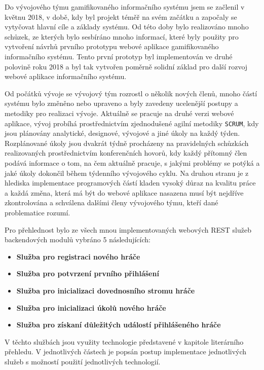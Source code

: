 \documentclass[twoside, 12pt]{article}
\begin{document}
{Do vývojového týmu gamifikovaného informačního systému jsem se začlenil v květnu 2018,
v době, kdy byl projekt téměř na svém začátku a započaly se vytyčovat hlavní cíle a základy systému.
Od této doby bylo realizováno mnoho schůzek, ze kterých bylo sesbíráno mnoho informací,
které byly použity pro vytvoření návrhů prvního prototypu webové aplikace gamifikovaného informačního systému.
Tento první prototyp byl implementován ve druhé polovině roku 2018 a byl tak vytvořen poměrně solidní základ
pro další rozvoj webové aplikace informačního systému.

Od počátků vývoje se vývojový tým rozrostl o několik nových členů,
mnoho částí systému bylo změněno nebo upraveno a byly zavedeny ucelenější postupy
a metodiky pro realizaci vývoje.
Aktuálně se pracuje na druhé verzi webové aplikace, vývoj probíhá prostřednictvím
zjednodušené agilní metodiky \texttt{SCRUM}, kdy jsou plánovány analytické, designové, vývojové a jiné
úkoly na každý týden. Rozplánované úkoly jsou dvakrát týdně procházeny na pravidelných schůzkách
realizovaných prostřednictvím konferenčních hovorů, kdy každý přítomný člen podává informace
o tom, na čem aktuálně pracuje, s jakými problémy se potýká a jaké úkoly dokončil během týdenního vývojového cyklu.
Na druhou stranu je z hlediska implementace programových částí kladen vysoký důraz na kvalitu práce
a každá změna, která má být do webové aplikace nasazena musí být nejdříve zkontrolována a schválena dalšími
členy vývojového týmu, kteří dané problematice rozumí.

Pro přehlednost bylo ze všech mnou implementovaných webových
REST služeb backendových modulů vybráno 5 následujících:

\begin{itemize}
\item \textbf{Služba pro registraci nového hráče}
\item \textbf{Služba pro potvrzení prvního přihlášení}
\item \textbf{Služba pro inicializaci dovednosního stromu hráče}
\item \textbf{Služba pro inicializaci úkolů nového hráče}
\item \textbf{Služba pro získaní důležitých událostí přihlášeného hráče}
\end{itemize}

V těchto službách jsou využity technologie představené v kapitole literárního přehledu.
V jednotlivých částech je popsán postup implementace jednotlivých služeb s možností použití jednotlivých technologií.

}
\end{document}
